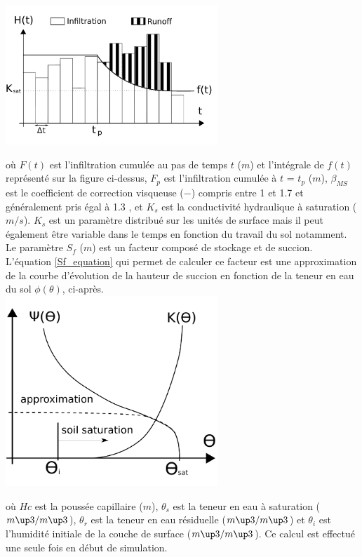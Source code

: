 \includegraphics[width=8cm]{common/Separation_infiltration_ruissellement_MSeytoux.pdf}


où $F(t)$ est l'infiltration cumulée au pas de temps $t$ ($m$) et l'intégrale de $f(t)$ représenté sur la figure ci-dessus, $F_p$ est l’infiltration cumulée à $t$ = $t_p$ ($m$), $\beta_{MS}$ est le coefficient de correction visqueuse ($-$) compris entre 1 et 1.7 et généralement pris égal à 1.3 \cite{MorelS1984}, et $K_s$ est la conductivité hydraulique à saturation ($m/s$). $K_s$ est un paramètre distribué sur les unités de surface mais il peut également être variable dans le temps en fonction du travail du sol notamment.\\

Le paramètre $S_f$ ($m$) est un facteur composé de stockage et de succion. L'équation \ref{Sf_equation} qui permet de calculer ce facteur est une approximation de la courbe d'évolution de la hauteur de succion en fonction de la teneur en eau du sol $\phi(\theta)$, ci-après.\\

\includegraphics[width=8cm]{common/Sf_approximation.pdf}


où $Hc$ est la poussée capillaire ($m$), $\theta_s$ est la teneur en eau à saturation ($m\up3 /m\up3$), $\theta_r$ est la teneur en eau résiduelle ($m\up3 /m\up3$) et $\theta_i$ est l’humidité initiale de la couche de surface ($m\up3 /m\up3$). Ce calcul est effectué une seule fois en début de simulation.\\

